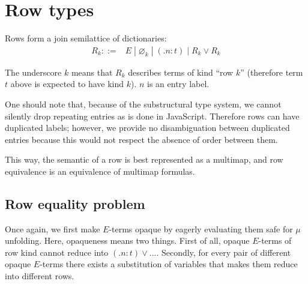 \documentclass[a4paper,14pt]{extreport}
\begin{document}
\section{Row types}

Rows form a join semilattice of dictionaries:
\[
    \begin{array}{rl}
        R_k ::=& E \;|\; \varnothing_k \;|\; (.n : t) \;|\; R_k \lor R_k
    \end{array}
\]

The underscore $k$ means that $R_k$ describes terms of kind ``row $k$''
(therefore term $t$ above is expected to have kind $k$). $n$ is an entry label.

One should note that, because of the substructural type system, we cannot
silently drop repeating entries as is done in JavaScript. Therefore rows can
have duplicated labels; however, we provide no disambiguation between duplicated
entries because this would not respect the absence of order between them.

This way, the semantic of a row is best represented as a multimap, and row
equivalence is an equivalence of multimap formulas.

\subsection{Row equality problem}

Once again, we first make $E$-terms opaque by eagerly evaluating them safe for
$\mu$ unfolding. Here, opaqueness means two things. First of all, opaque
$E$-terms of row kind cannot reduce into $(.n : t) \lor \ldots$. Secondly,
for every pair of different opaque $E$-terms there exists a substitution of
variables that makes them reduce into different rows.
\end{document}
